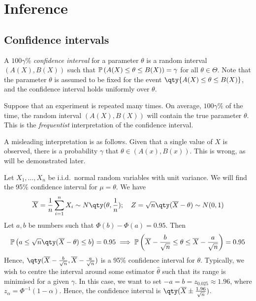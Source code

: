 \section{Inference}

\subsection{Confidence intervals}
\begin{definition}
	A $100 \gamma$\% \textit{confidence interval} for a parameter $\theta$ is a random interval $(A(X), B(X))$ such that $\mathbb{P}\left({A(X) \leq \theta \leq B(X)}\right) = \gamma$ for all $\theta \in \Theta$.
	Note that the parameter $\theta$ is assumed to be fixed for the event $\qty{A(X) \leq \theta \leq B(X)}$, and the confidence interval holds uniformly over $\theta$.
\end{definition}
\begin{remark}
	Suppose that an experiment is repeated many times.
	On average, $100 \gamma$\% of the time, the random interval $(A(X), B(X))$ will contain the true parameter $\theta$.
	This is the \textit{frequentist} interpretation of the confidence interval.

	A misleading interpretation is as follows.
	Given that a single value of $X$ is observed, there is a probability $\gamma$ that $\theta \in (A(x), B(x))$.
	This is wrong, as will be demonstrated later.
\end{remark}
\begin{example}
	Let $X_1, \dots, X_n$ be i.i.d.\ normal random variables with unit variance.
	We will find the 95\% confidence interval for $\mu = \theta$.
	We have
	\begin{align*}
		\overline X = \frac{1}{n} \sum_{i=1}^n X_i \sim N\qty(\theta, \frac{1}{n});\quad Z = \sqrt{n}\qty(\overline X - \theta) \sim N(0,1)
	\end{align*}
	Let $a, b$ be numbers such that $\Phi(b) - \Phi(a) = 0.95$.
	Then
	\begin{align*}
		\prob{a \leq \sqrt{n} \qty(\overline X - \theta) \leq b} = 0.95 \implies \prob{\overline X - \frac{b}{\sqrt{n}} \leq \theta \leq \overline X - \frac{a}{\sqrt{n}}} = 0.95
	\end{align*}
	Hence, $\qty(\overline X - \frac{b}{\sqrt{n}}, \overline X - \frac{a}{\sqrt{n}})$ is a 95\% confidence interval for $\theta$.
	Typically, we wish to centre the interval around some estimator $\hat\theta$ such that its range is minimised for a given $\gamma$.
	In this case, we want to set $-a = b = z_{0.025} \approx 1.96$, where $z_\alpha = \Phi^{-1}(1-\alpha)$.
	Hence, the confidence interval is $\qty(\overline X \pm \frac{1.96}{\sqrt{n}})$.
\end{example}
